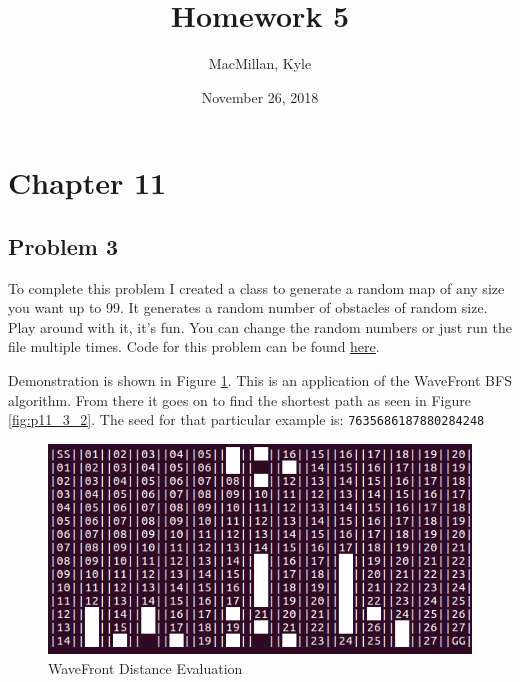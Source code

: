 \documentclass{article}
\title{\textbf{Homework 5}}
\author{MacMillan, Kyle}
\date{November 26, 2018}
\begin{document}
\maketitle

\newpage
\tableofcontents
{}
\newpage
\listoffigures
{}



\newpage
\hypersetup{
    colorlinks,
    citecolor=blue,
    filecolor=black,
    linkcolor=blue,
    urlcolor=blue
}

\setcounter{page}{1}
\newpage
\section{\textbf{Chapter 11}}
\subsection{Problem 3}
To complete this problem I created a class to generate a random map of any 
size you want up to 99. It generates a random number of obstacles of random 
size. Play around with it, it's fun. You can change the random numbers or just 
run the file multiple times. Code for this problem can be found 
\href{https://github.com/macattackftw/RoboticsHW/blob/master/HW5/problem11_3.py}{here}.

Demonstration is shown in Figure \ref{fig:p11_3_1}. This is an application of 
the WaveFront BFS algorithm. From there it goes on to find the shortest path as 
seen in Figure \ref{fig:p11_3_2}. The seed for that particular example 
is: \texttt{7635686187880284248}

\begin{figure}[h]
    \centering
    \includegraphics[scale=2.5]{problem11_3_1}
    \caption{WaveFront Distance Evaluation}
    \label{fig:p11_3_1}
\end{figure}
\end{document}
